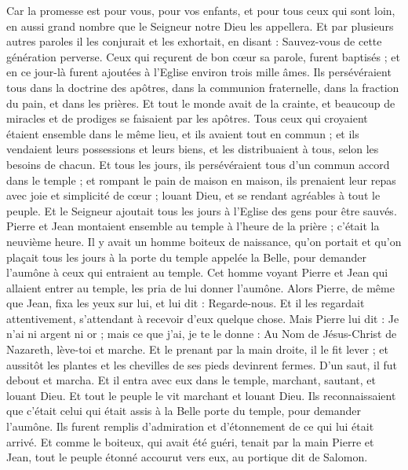\begin{multicols}{2}
Car la promesse est pour vous, pour vos enfants, et pour tous ceux qui sont loin, en aussi grand nombre que le Seigneur notre Dieu les appellera.
Et par plusieurs autres paroles il les conjurait et les exhortait, en disant : Sauvez-vous de cette génération perverse.
Ceux qui reçurent de bon cœur sa parole, furent baptisés ; et en ce jour-là furent ajoutées à l'Eglise environ trois mille âmes.
Ils persévéraient tous dans la doctrine des apôtres, dans la communion fraternelle, dans la fraction du pain, et dans les prières.
Et tout le monde avait de la crainte, et beaucoup de miracles et de prodiges se faisaient par les apôtres.
Tous ceux qui croyaient étaient ensemble dans le même lieu, et ils avaient tout en commun ;
et ils vendaient leurs possessions et leurs biens, et les distribuaient à tous, selon les besoins de chacun.
Et tous les jours, ils persévéraient tous d'un commun accord dans le temple ; et rompant le pain de maison en maison, ils prenaient leur repas avec joie et simplicité de cœur ;
louant Dieu, et se rendant agréables à tout le peuple. Et le Seigneur ajoutait tous les jours à l'Eglise des gens pour être sauvés.
\VerseOne{}Pierre et Jean montaient ensemble au temple à l'heure de la prière ; c’était la neuvième heure.
Il y avait un homme boiteux de naissance, qu’on portait et qu’on plaçait tous les jours à la porte du temple appelée la Belle, pour demander l'aumône à ceux qui entraient au temple.
Cet homme voyant Pierre et Jean qui allaient entrer au temple, les pria de lui donner l'aumône.
Alors Pierre, de même que Jean, fixa les yeux sur lui, et lui dit : Regarde-nous.
Et il les regardait attentivement, s'attendant à recevoir d'eux quelque chose.
Mais Pierre lui dit : Je n'ai ni argent ni or ; mais ce que j'ai, je te le donne : Au Nom de Jésus-Christ de Nazareth, lève-toi et marche.
Et le prenant par la main droite, il le fit lever ; et aussitôt les plantes et les chevilles de ses pieds devinrent fermes.
D’un saut, il fut debout et marcha. Et il entra avec eux dans le temple, marchant, sautant, et louant Dieu.
Et tout le peuple le vit marchant et louant Dieu.
Ils reconnaissaient que c'était celui qui était assis à la Belle porte du temple, pour demander l'aumône. Ils furent remplis d'admiration et d'étonnement de ce qui lui était arrivé.
Et comme le boiteux, qui avait été guéri, tenait par la main Pierre et Jean, tout le peuple étonné accourut vers eux, au portique dit de Salomon.

\end{multicols}
